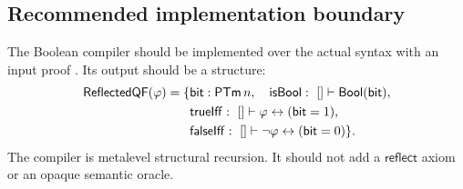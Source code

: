 \subsection{Recommended implementation boundary}

The Boolean compiler should be implemented over the actual
 syntax with an input proof .  Its output should be a
structure:
\[
\begin{split}
\mathsf{ReflectedQF}(\varphi)=\{&
  \mathsf{bit}:\mathsf{PTm}\,n,\quad
  \mathsf{isBool}:\ []\vdash\mathsf{Bool}(\mathsf{bit}),\\
 &\mathsf{trueIff}:\ []\vdash
       \varphi\leftrightarrow(\mathsf{bit}=1),\\
 &\mathsf{falseIff}:\ []\vdash
       \neg\varphi\leftrightarrow(\mathsf{bit}=0)\}.
\end{split}
\]
The compiler is metalevel structural recursion.  It should not add a
\(\mathsf{reflect}\) axiom or an opaque semantic oracle.
